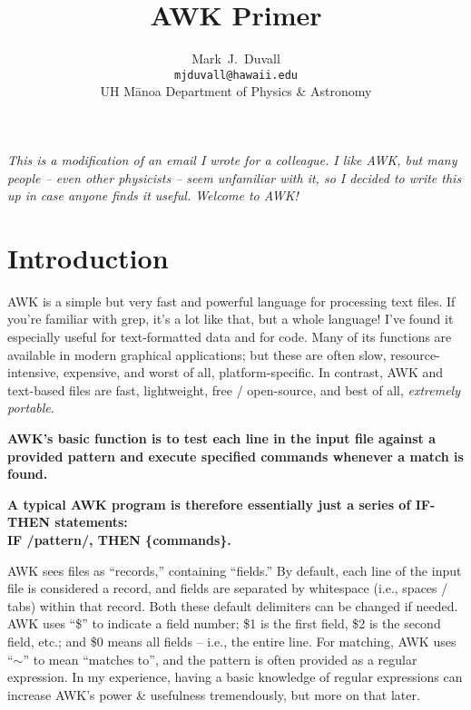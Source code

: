 \documentclass[10pt,a4]{article}
\begin{document}
\title{AWK Primer}
\author{Mark~J.~Duvall\\
\texttt{mjduvall@hawaii.edu}\\
UH M\={a}noa Department of Physics \& Astronomy}
\date{}
\maketitle




\emph{This is a modification of an email I wrote for a colleague. I like AWK, but many people -- even other physicists -- seem unfamiliar with it, so I decided to write this up in case anyone finds it useful. Welcome to AWK!}


\section*{Introduction}


AWK is a simple but very fast and powerful language for processing text files. If you're familiar with grep, it's a lot like that, but a whole language! I've found it especially useful for text-formatted data and for code. Many of its functions are available in modern graphical applications; but these are often slow, resource-intensive, expensive, and worst of all, platform-specific. In contrast, AWK and text-based files are fast, lightweight, free / open-source, and best of all, \emph{extremely portable}.

\textbf{AWK's basic function is to test each line in the input file against a provided pattern and execute specified commands whenever a match is found.}

\textbf{A typical AWK program is therefore essentially just a series of IF-THEN statements:\\
IF /pattern/, THEN \{commands\}.}

AWK sees files as ``records,'' containing ``fields.'' By default, each line of the input file is considered a record, and fields are separated by whitespace (i.e., spaces / tabs) within that record. Both these default delimiters can be changed if needed.
AWK uses ``\$'' to indicate a field number; \$1 is the first field, \$2 is the second field, etc.; and \$0 means all fields -- i.e., the entire line.
For matching, AWK uses ``$\sim$'' to mean ``matches to'', and the pattern is often provided as a regular expression.
In my experience, having a basic knowledge of regular expressions can increase AWK's power \& usefulness tremendously, but more on that later.
\end{document}

